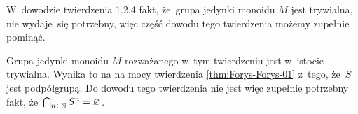 \documentclass[a4paper,11pt]{article}
\begin{document}
\start {} W~dowodzie twierdzenia 1.2.4 fakt, że~grupa jedynki monoidu
$M$ jest trywialna, nie wydaje~się potrzebny, więc część dowodu tego
twierdzenia możemy zupełnie pominąć.

Grupa jedynki monoidu $M$ rozważanego w~tym twierdzeniu jest w~istocie
trywialna. Wynika to na na mocy twierdzenia \ref{thm:Forys-Forys-01}
z~tego, że~$S$ jest podpółgrupą. Do dowodu tego twierdzenia nie jest więc
zupełnie potrzebny fakt, że~$\bigcap_{ n \in \mathbb{N} } S^{ n } = \varnothing$.

\vspace{\spaceFour}





\start {}









\newpage

\end{document}
